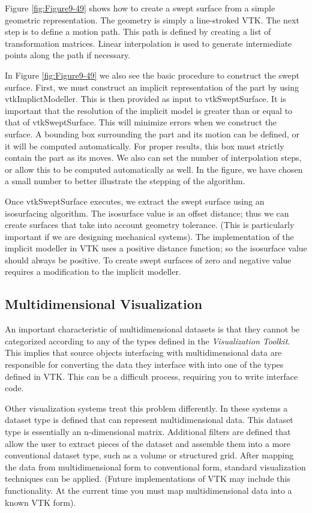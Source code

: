Figure \ref{fig:Figure9-49} shows how to create a swept surface from a simple geometric representation. The geometry is simply a line-stroked VTK. The next step is to define a motion path. This path is defined by creating a list of transformation matrices. Linear interpolation is used to generate intermediate points along the path if necessary.

In Figure \ref{fig:Figure9-49} we also see the basic procedure to construct the swept surface. First, we must construct an implicit representation of the part by using vtkImplictModeller. This is then provided as input to vtkSweptSurface. It is important that the resolution of the implicit model is greater than or equal to that of vtkSweptSurface. This will minimize errors when we construct the surface. A bounding box surrounding the part and its motion can be defined, or it will be computed automatically. For proper results, this box must strictly contain the part as its moves. We also can set the number of interpolation steps, or allow this to be computed automatically as well. In the figure, we have chosen a small number to better illustrate the stepping of the algorithm.

Once vtkSweptSurface executes, we extract the swept surface using an isosurfacing algorithm. The isosurface value is an offset distance; thus we can create surfaces that take into account geometry tolerance. (This is particularly important if we are designing mechanical systems). The implementation of the implicit modeller in VTK uses a positive distance function; so the isosurface value should always be positive. To create swept surfaces of zero and negative value requires a modification to the implicit modeller.

\subsection{Multidimensional Visualization}

An important characteristic of multidimensional datasets is that they cannot be categorized according to any of the types defined in the \emph{Visualization Toolkit}. This implies that source objects interfacing with multidimensional data are responsible for converting the data they interface with into one of the types defined in VTK. This can be a difficult process, requiring you to write interface code.

Other visualization systems treat this problem differently. In these systems a dataset type is defined that can represent multidimensional data. This dataset type is essentially an n-dimensional matrix. Additional filters are defined that allow the user to extract pieces of the dataset and assemble them into a more conventional dataset type, such as a volume or structured grid. After mapping the data from multidimensional form to conventional form, standard visualization techniques can be applied. (Future implementations of VTK may include this functionality. At the current time you must map multidimensional data into a known VTK form).

